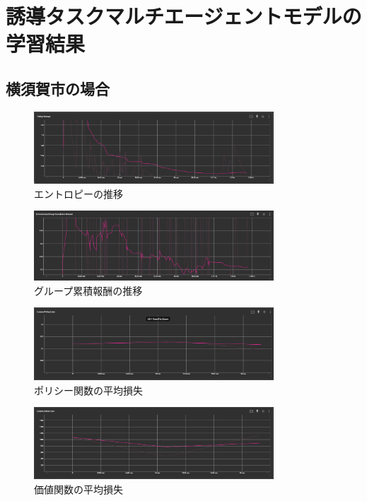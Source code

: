 \chapter{誘導タスクマルチエージェントモデルの学習結果}

\section{横須賀市の場合}
\begin{figure}[H] 
  \centering 
  \includegraphics[width=0.8\textwidth]{Figures/Yokosuka-Entropy.png}
  \caption{エントロピーの推移} 
  \label{fig:fig-01}
\end{figure}
\begin{figure}[H] 
  \centering 
  \includegraphics[width=0.8\textwidth]{Figures/Yokosuka-GroupReward.png}
  \caption{グループ累積報酬の推移} 
  \label{fig:fig-01}
\end{figure}
\begin{figure}[H] 
  \centering 
  \includegraphics[width=0.8\textwidth]{Figures/Yokosuka-PolycyLoss.png}
  \caption{ポリシー関数の平均損失} 
  \label{fig:fig-01}
\end{figure}
\begin{figure}[H] 
  \centering 
  \includegraphics[width=0.8\textwidth]{Figures/YokosukaValueLoss.png}
  \caption{価値関数の平均損失} 
  \label{fig:fig-01}
\end{figure}


